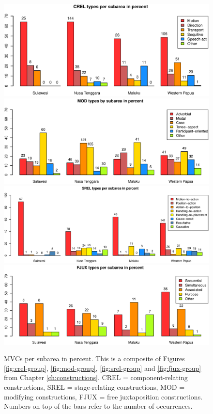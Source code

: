 \begin{figure}
\begin{minipage}{1.0\textwidth}
\includegraphics[width=.5\columnwidth]{figures/CREL_Group.eps}
\includegraphics[width=.5\columnwidth]{figures/MOD_Group.eps}
\includegraphics[width=.5\columnwidth]{figures/SREL_Group.eps}
\includegraphics[width=.5\columnwidth]{figures/FJUX_group.eps}
\caption[MVCs per subarea in percent]{MVCs per subarea in percent. This is a composite of Figures \ref{fig:crel-group}, \ref{fig:mod-group}, \ref{fig:srel-group} and \ref{fig:fjux-group} from Chapter \ref{ch:constructions}. CREL = component-relating constructions, SREL = stage-relating constructions, MOD = modifying constructions, FJUX = free juxtaposition constructions. Numbers on top of the bars refer to the number of occurrences.}\label{fig:MVCs_subarea}
\end{minipage}
\end{figure}


